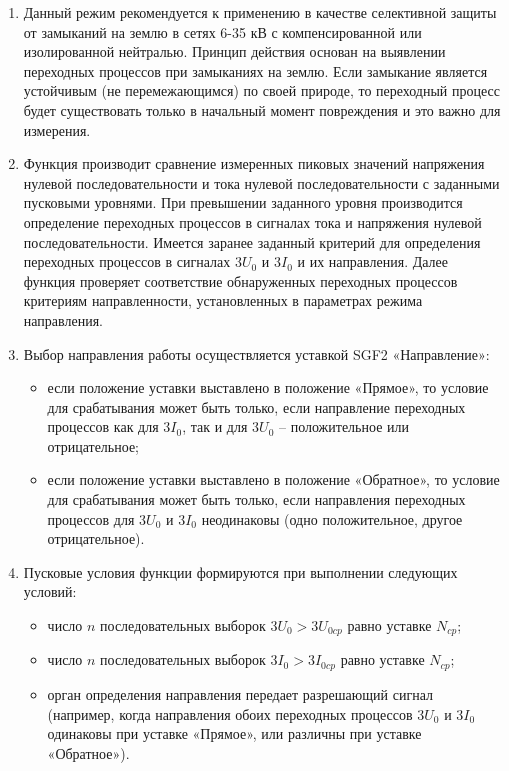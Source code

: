 \begin{enumerate}
\begin{enumerate}
\item
Данный режим рекомендуется к применению в качестве селективной защиты от замыканий на землю в сетях 6-35 кВ с компенсированной или изолированной нейтралью. Принцип действия основан на выявлении переходных процессов при замыканиях на землю. Если замыкание является устойчивым (не перемежающимся) по своей природе, то переходный процесс будет существовать только в начальный момент повреждения и это важно для измерения.

\item
Функция производит сравнение измеренных пиковых значений напряжения нулевой последовательности и тока нулевой последовательности с заданными пусковыми уровнями. При превышении заданного уровня производится определение переходных процессов в сигналах тока и напряжения нулевой последовательности. Имеется заранее заданный критерий для определения переходных процессов в сигналах $3U_0$ и $3I_0$  и их направления. Далее функция проверяет соответствие обнаруженных переходных процессов критериям направленности, установленных в параметрах режима направления.

\item
Выбор направления работы осуществляется уставкой SGF2 «Направление»:
\begin{itemize}
    \item если положение уставки выставлено в положение «Прямое», то условие для срабатывания может быть только, если направление переходных процессов как для $3I_0$, так и для $3U_0$ -- положительное или отрицательное;
    \item если положение уставки выставлено в положение «Обратное», то условие для срабатывания может быть только, если направления переходных процессов для $3U_0$ и $3I_0$ неодинаковы (одно положительное, другое отрицательное).
\end{itemize}

\item
Пусковые условия функции формируются при выполнении следующих условий:
\begin{itemize}
    \item число $n$ последовательных выборок $3U_0 > 3U_{0cp}$ равно уставке $N_{cp}$;
    \item число $n$ последовательных выборок $3I_0 > 3I_{0cp}$ равно уставке $N_{cp}$;
    \item орган определения направления передает разрешающий сигнал (например, когда направления обоих переходных процессов $3U_0$ и $3I_0$ одинаковы при уставке «Прямое», или различны при уставке «Обратное»).
\end{itemize}


\end{enumerate}
\end{enumerate}
